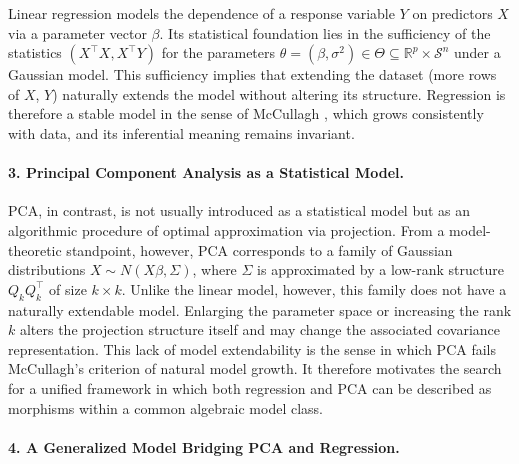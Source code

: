 Linear regression models the dependence of a response variable $Y$ on predictors $X$ via a parameter vector $\beta$. Its statistical foundation lies in the sufficiency of the statistics $(X^\top X, X^\top Y)$ for the parameters $\theta =(\beta,\sigma^2)\in \Theta \subseteq \mathbb{R}^p \times \mathcal{S}^n $ under a Gaussian model.
This sufficiency implies that extending the dataset (more rows of $X$, $Y$) naturally extends the model without altering its structure. Regression is therefore a stable model in the sense of McCullagh \cite{mccullagh}, which grows consistently with data, and its inferential meaning remains invariant.

\paragraph{3. Principal Component Analysis as a Statistical Model.}

PCA, in contrast, is not usually introduced as a statistical model but as an algorithmic procedure of optimal approximation via projection. From a model-theoretic standpoint, however, PCA corresponds to a family of Gaussian distributions $X \sim N(X\beta, \Sigma)$, where $\Sigma$ is approximated by a low-rank structure $Q_k Q_k^\top$ of size $k \times k$. Unlike the linear model, however, this family does not have a naturally extendable model. Enlarging the parameter space or increasing the rank $k$ alters the projection structure itself and may change the associated covariance representation. This lack of model extendability is the sense in which PCA fails McCullagh’s criterion of natural model growth. It therefore motivates the search for a unified framework in which both regression and PCA can be described as morphisms within a common algebraic model class.

\paragraph{4. A Generalized Model Bridging PCA and Regression.}

